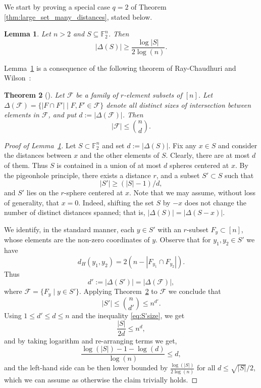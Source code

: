 \documentclass{article}
\newtheorem{thm}{Theorem}%
\newtheorem{lem}[thm]{Lemma}
\theoremstyle{definition}
\begin{document}
We start by proving a special case $q=2$ of Theorem \ref{thm:large_set_many_distances}, stated below.
\begin{lem}\label{thm:binary:large_set_many_distances}
Let $n > 2$ and  
$
S\subseteq \mathbb{F}_2^n$. Then 
$$
|\Delta(S)|\ge \frac{\log |S|}{2\log(n)}.
$$
\end{lem}

Lemma~\ref{thm:binary:large_set_many_distances} is a consequence of the following theorem of Ray-Chaudhuri and Wilson~\cite{ray1975t}: 
\begin{thm}[\cite{ray1975t}]\label{thm:frankl_wilson}
Let 
$\mathcal{F}$ be a family of $r$-element subsets of $[n]$. Let $\Delta(\mathcal{F})=\{|F\cap F'|\mid F,F'\in\mathcal{F}\}$ denote all distinct sizes of intersection between elements in $\mathcal{F}$, and put $d:=|\Delta(\mathcal{F})|$.
Then $$
|\mathcal{F}|\le \binom{n}{d}
.$$
\end{thm}

\begin{proof}[Proof of Lemma~\ref{thm:binary:large_set_many_distances}]
Let $S\subset\mathbb{F}_2^n$ and set $d:=|\Delta(S)|$.
Fix any $x\in S$ and consider the distances between $x$ and the other elements of $S$. Clearly, there are at most $d$ of them. Thus $S$ is contained in a union of at most $d$ spheres centered at $x$. By the pigeonhole principle, there exists a distance $r$, and a subset $S'\subset S$ such that 
\begin{equation}\label{eq:S'size}|S'|\ge (|S|-1)/d,
\end{equation} and $S'$ lies on the $r$-sphere centered at $x$. 
Note that we may assume, without loss of generality, that $x=0$. 
Indeed, shifting the set $S$ by $-x$ does not change the number of distinct distances spanned; that is, $|\Delta(S)|=|\Delta(S-x)|$. 

We identify, in the standard manner, each  $y\in S'$ with an $r$-subset $F_y\subset [n]$, whose elements are the non-zero coordinates of $y$. 
Observe that for $y_1,y_2\in S'$ we have
$$d_H(y_1,y_2)=2(n-|F_{y_1}\cap F_{y_2}|).$$
Thus 
$$
d':=
|\Delta(S')|=|\Delta(\mathcal{F})|,$$
where $\mathcal{F}=\{F_y\mid y\in S'\}$.
Applying Theorem~\ref{thm:frankl_wilson} to $\mathcal{F}$ we conclude that
$$
 |S'|\le \binom{n}{d'}\le n^{d'}.$$
Using $1\le d'\le d\le n$ and the inequality \eqref{eq:S'size}, 
 we get 
 $$
 \frac{|S|}{2d}\le n^d,
 $$ 
and by taking logarithm and re-arranging terms we get,
$$
\frac{\log(|S|) - 1 - \log(d)}{\log(n)}\le d,
$$
and the left-hand side can be then lower bounded by $\frac{\log(|S|)}{2\log(n)}$  for all $d \le \sqrt{|S|}/2$, which we can assume as otherwise the claim trivially holds.
 \end{proof}
\end{document}
